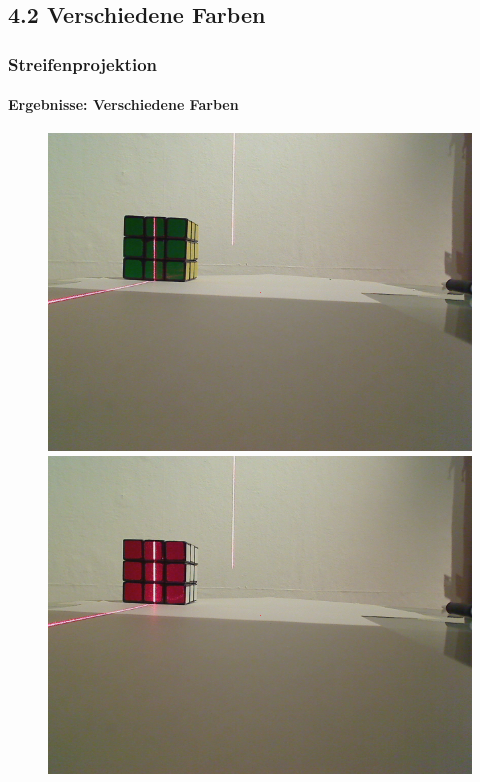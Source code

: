 \documentclass{beamer}
\begin{document}
\subsection{4.2 \hspace{5px} Verschiedene Farben}
\begin{frame}
	\frametitle{Streifenprojektion}
	\framesubtitle{Ergebnisse: Verschiedene Farben}

	\begin{figure}
		\begin{minipage}{0.32\linewidth}
			\includegraphics[width=\linewidth]{includes/test_color_1}
		\end{minipage}
		\hfill
		\begin{minipage}{0.32\linewidth}
			\includegraphics[width=\linewidth]{includes/test_color_2}

\end{minipage}
\end{figure}
\end{frame}
\end{document}
